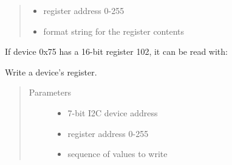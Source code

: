 \begin{fulllineitems}
\begin{fulllineitems}
\begin{quote}
\begin{description}
\begin{itemize}
\item {} 
 \textendash{} register address 0-255

\item {} 
 \textendash{}  format string for the register contents

\end{itemize}

\end{description}\end{quote}

If device 0x75 has a 16-bit register 102, it can be read with:

\begin{sphinxVerbatim}[commandchars=\\\{\}]
  
\end{sphinxVerbatim}

\end{fulllineitems}


\begin{fulllineitems}
\label{\detokenize{index:i2cdriver.I2CDriver.regwr}}
Write a device’s register.
\begin{quote}\begin{description}
\item[{Parameters}] \leavevmode\begin{itemize}
\item {} 
 \textendash{} 7-bit I2C device address

\item {} 
 \textendash{} register address 0-255

\item {} 
 \textendash{} sequence of values to write

\end{itemize}


\end{description}
\end{quote}
\end{fulllineitems}
\end{fulllineitems}
